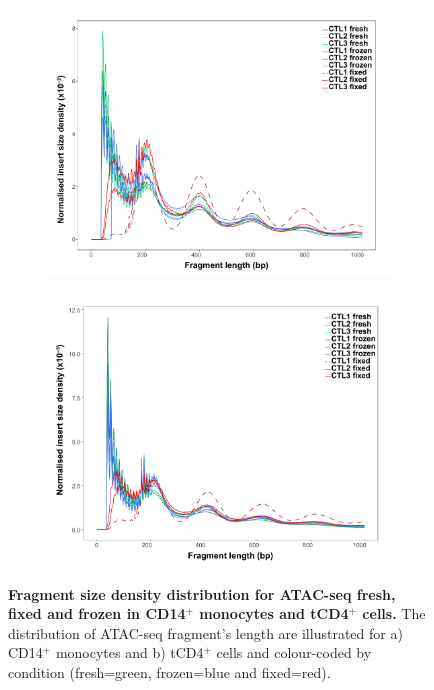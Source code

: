 \begin{figure}[htbp]
\centering
\begin{subfigure}{0.5\textwidth}
\centering
\includegraphics[width=\textwidth]{./Results1/pdfs/Core_ATAC_CD14_fresh_frozen_fixed_frag_size_distribution}
\caption{\textbf{}}
\end{subfigure}%
\begin{subfigure}{0.5\textwidth}
\centering
\includegraphics[width=\textwidth]{./Results1/pdfs/Core_ATAC_CD4_fresh_frozen_fixed_frag_size_distribution}
\caption{\textbf{}}
\end{subfigure}
\caption[Fragment size density distribution for ATAC-seq fresh, fixed and frozen in CD14$^+$ monocytes and tCD4$^+$ cells.]{\textbf{Fragment size density distribution for ATAC-seq fresh, fixed and frozen in CD14$^+$ monocytes and tCD4$^+$ cells.} The distribution of ATAC-seq fragment's length are illustrated for a) CD14$^+$ monocytes and b) tCD4$^+$ cells and colour-coded by condition (fresh=green, frozen=blue and fixed=red).}
\label{figure:Core_ATAC_all_fragment_size_distribution}
\end{figure} 



